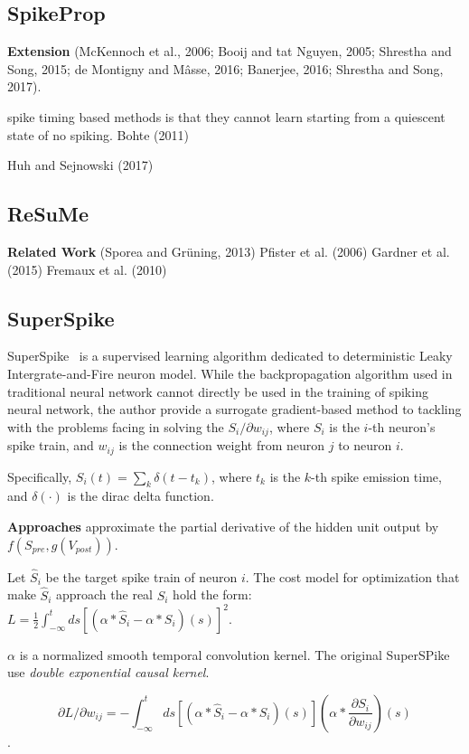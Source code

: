 \subsection{SpikeProp}



\textbf{Extension}
(McKennoch et al., 2006; Booij and tat Nguyen, 2005; Shrestha and Song, 2015; de Montigny and Mâsse, 2016; Banerjee, 2016; Shrestha and Song, 2017).

spike timing based methods is that they cannot learn starting from a quiescent state of no spiking.
Bohte (2011)

Huh and Sejnowski (2017)

\subsection{ReSuMe}
\textbf{Related Work}
(Sporea and Grüning, 2013)
Pfister et al. (2006)
Gardner et al. (2015)
Fremaux et al. (2010)


\subsection{SuperSpike}
SuperSpike~\cite{super-spike} is a supervised learning algorithm dedicated to deterministic
 Leaky Intergrate-and-Fire neuron model. While the backpropagation algorithm used in 
 traditional neural network cannot directly be used in the training of spiking neural network,
 the author provide a surrogate gradient-based method to tackling with the problems facing
 in solving the $S_i/\partial w_{ij}$, where $S_i$ is the $i$-th neuron's spike train, and 
 $w_{ij}$ is the connection weight from neuron $j$ to neuron $i$.

 Specifically, $S_i(t) = \sum_{k} \delta(t - t_k)$, where $t_k$ is the $k$-th spike emission time,
 and $\delta(\cdot)$ is the dirac delta function.


\textbf{Approaches}
approximate the partial derivative of the hidden unit output by $f(S_{pre},  g(V_{post}))$.

Let $\hat S_i$ be the target spike train of neuron $i$.
The cost model for optimization that make $\hat S_i$ approach the real $S_i$ hold the form:
$L=\frac12 \int_{-\infty}^t ds[(\alpha * \hat S_i - \alpha * S_i)(s)]^2$.

$\alpha$ is a normalized smooth temporal convolution kernel. The original SuperSPike use 
\textit{double exponential causal kernel}.

$$\partial L/\partial w_{ij}=-\int_{-\infty}^t ds[(\alpha * \hat S_i - \alpha * S_i)(s)](\alpha * \frac{\partial S_i}{\partial w_{ij}})(s)$$.

